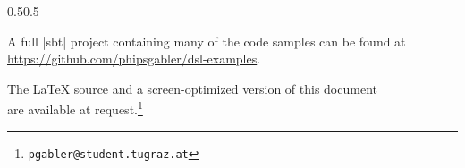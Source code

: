 \documentclass[11pt,a4paper,twoside]{memoir}
\begin{document}
\begin{adjustwidth}{\absleftindent}{\absrightindent}
  \vspace{2ex}
  
  \begin{adjustwidth}{0.5\absleftindent}{0.5\absrightindent}
    \begin{Center}
      A full |sbt| project containing many of the code samples can be found at
      \url{https://github.com/phipsgabler/dsl-examples}. 

      The \LaTeX{} source and a screen-optimized version of this document \\
      are available at request.\footnote{\texttt{pgabler@student.tugraz.at}}
    \end{Center}
  \end{adjustwidth}
  

\end{adjustwidth}
\end{document}
